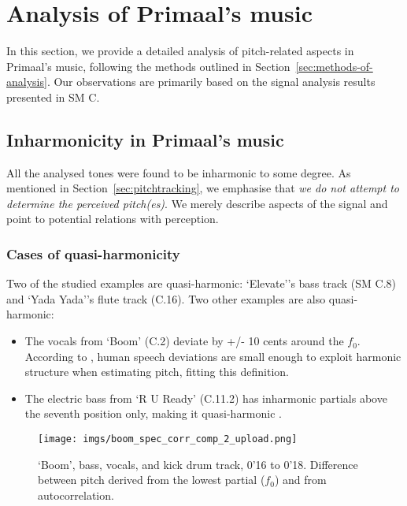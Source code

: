 \documentclass{article}
\begin{document}


\section{Analysis of Primaal's music}
\label{sec:analyses-of-works}


In this section, we provide a detailed analysis of pitch-related aspects in Primaal's music, following the methods outlined in Section~\ref{sec:methods-of-analysis}. Our observations are primarily based on the signal analysis results presented in SM C.

\subsection{Inharmonicity in Primaal's music}\label{sec:inharmonicityprimaal} 

All the analysed tones were found to be inharmonic to some degree. As mentioned in Section~\ref{sec:pitchtracking}, we emphasise that {\em we do not attempt to determine the perceived pitch(es)}. We merely describe aspects of the signal and point to potential relations with perception.

\subsubsection{Cases of quasi-harmonicity}

Two of the studied examples are quasi-harmonic: `Elevate''s bass track (SM C.8) and `Yada Yada''s flute track (C.16). Two other examples are also quasi-harmonic:

\begin{itemize}[noitemsep]
    \item The vocals from `Boom' (C.2) deviate by +/- 10 cents around the $f_0$. According to \citet{elvander2020harmonic}, human speech deviations are small enough to exploit harmonic structure when estimating pitch, fitting this definition.
    \item The electric bass from `R U Ready' (C.11.2) has inharmonic partials above the seventh position only, making it quasi-harmonic \citep{jarvelainen1999audibility}.
\end{itemize}

\begin{figure}[htbp]
  \centering
  \texttt{[image: imgs/boom\_spec\_corr\_comp\_2\_upload.png]}
  \caption{`Boom', bass, vocals, and kick drum track, 0'16 to 0'18. Difference between pitch derived from the lowest partial ($f_0$) and from autocorrelation.}
\label{fig:boomspeccorrcomp}
\end{figure}
\end{document}
